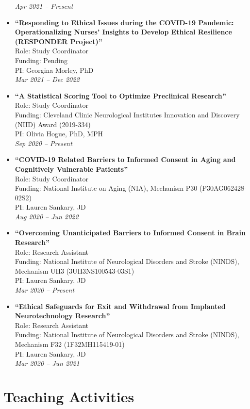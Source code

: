 \documentclass[
  letterpaper,
  DIV=11,
  numbers=noendperiod]{scrartcl}
\begin{document}
\begin{itemize}
  \emph{Apr 2021 -- Present}
\item
  \textbf{``Responding to Ethical Issues during the COVID-19 Pandemic:
  Operationalizing Nurses' Insights to Develop Ethical Resilience
  (RESPONDER Project)''}\\
  Role: Study Coordinator\\
  Funding: Pending\\
  PI: Georgina Morley, PhD\\
  \emph{Mar 2021 -- Dec 2022}
\item
  \textbf{``A Statistical Scoring Tool to Optimize Preclinical
  Research''}\\
  Role: Study Coordinator\\
  Funding: Cleveland Clinic Neurological Institutes Innovation and
  Discovery (NIID) Award (2019-334)\\
  PI: Olivia Hogue, PhD, MPH\\
  \emph{Sep 2020 -- Present}
\item
  \textbf{``COVID-19 Related Barriers to Informed Consent in Aging and
  Cognitively Vulnerable Patients''}\\
  Role: Study Coordinator\\
  Funding: National Institute on Aging (NIA), Mechanism P30
  (P30AG062428-02S2)\\
  PI: Lauren Sankary, JD\\
  \emph{Aug 2020 -- Jun 2022}
\item
  \textbf{``Overcoming Unanticipated Barriers to Informed Consent in
  Brain Research''}\\
  Role: Research Assistant\\
  Funding: National Institute of Neurological Disorders and Stroke
  (NINDS), Mechanism UH3 (3UH3NS100543-03S1)\\
  PI: Lauren Sankary, JD\\
  \emph{Mar 2020 -- Present}
\item
  \textbf{``Ethical Safeguards for Exit and Withdrawal from Implanted
  Neurotechnology Research''}\\
  Role: Research Assistant\\
  Funding: National Institute of Neurological Disorders and Stroke
  (NINDS), Mechanism F32 (1F32MH115419-01)\\
  PI: Lauren Sankary, JD\\
  \emph{Mar 2020 -- Jun 2021}
\end{itemize}

\section{Teaching Activities}\label{teaching-activities}
\end{document}
